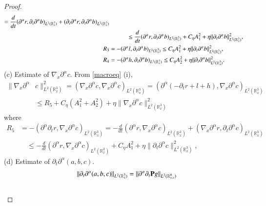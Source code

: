 \documentclass{amsart}[12pt, article]
\begin{document}
\begin{proof}
\begin{align*}
=\frac{d}{dt}({{\partial}}^\alpha   r,{{\partial}}_i{{\partial}}^\alpha  b)_{L^2({{{\mathbb R}}}^3_x)}+
({{\partial}}_i{{\partial}}^\alpha   r,{{\partial}}_t{{\partial}}^\alpha  b)_{L^2({{{\mathbb R}}}^3_x)}
\\&\hspace*{1cm}\le
\frac{d}{dt}({{\partial}}^\alpha   r,{{\partial}}_i{{\partial}}^\alpha  b)_{L^2({{{\mathbb R}}}^3_x)}+
C_\eta A_1^2
+\eta
\|{{\partial}}_t{{\partial}}^\alpha  b\|^2_{L^2({{{\mathbb R}}}^3_x)},
\\
R_3&=-({{\partial}}^\alpha   l,{{\partial}}_i{{\partial}}^\alpha  b)_{L^2({{{\mathbb R}}}^3_x)}\le
C_\eta A_1^2
+
\eta
\|{{\partial}}_i{{\partial}}^\alpha  b\|^2_{L^2({{{\mathbb R}}}^3_x)},
\\R_4&=-({{\partial}}^\alpha   h,{{\partial}}_i{{\partial}}^\alpha  b)_{L^2({{{\mathbb R}}}^3_x)}\le
C_\eta A_2^{{2}}
+
\eta
\|{{\partial}}_i{{\partial}}^\alpha  b\|^2_{L^2({{{\mathbb R}}}^3_x)}.
\end{align*}
(c) Estimate of $\nabla_x{{\partial}}^\alpha  c$. {}From \eqref{macroeq} (i),
 \begin{align*}
 \|\nabla_x {{\partial}}^\alpha &c\|_{L^2({{{\mathbb R}}}^3_x)}^2
=(\nabla_x {{\partial}}^\alpha c,\nabla_x {{\partial}}^\alpha c)_{L^2({{{\mathbb R}}}^3_x)}
= ({{\partial}}^\alpha (-{{\partial}}_tr+l+h),\nabla_x {{\partial}}^\alpha c)_{L^2({{{\mathbb R}}}^3_x)}
\\&
\le R_5 
+C_\eta(A_1^2+A_2^2)+\eta \|\nabla_x {{\partial}}^\alpha c\|_{L^2({{{\mathbb R}}}^3_x)}^2
\end{align*}
where
\begin{align*}
R_5&=-({{\partial}}^\alpha {{\partial}}_tr,\nabla_x {{\partial}}^\alpha c)_{L^2({{{\mathbb R}}}^3_x)}=
-\frac{d}{dt}({{\partial}}^\alpha r,\nabla_x {{\partial}}^\alpha c)_{L^2({{{\mathbb R}}}^3_x)}+
(\nabla_x{{\partial}}^\alpha r, {{\partial}}_t {{\partial}}^\alpha c)_{L^2({{{\mathbb R}}}^3_x)}
\\&\quad
\le
-\frac{d}{dt}({{\partial}}^\alpha r,\nabla_x {{\partial}}^\alpha c)_{L^2({{{\mathbb R}}}^3_x)}+
C_\eta A_1^2 
+\eta
\|{{\partial}}_t{{\partial}}^\alpha  c\|^2_{L^2({{{\mathbb R}}}^3_x)},
\end{align*}
(d) Estimate of ${{\partial}}_t{{\partial}}^\alpha  (a,b,c)$. \
\begin{align}\label{ptabc}
\|{{\partial}}_t{{\partial}}^\alpha & (a,b,c)\|_{L^2({{{\mathbb R}}}^3_x)}=\|{{\partial}}^\alpha {{\partial}}_t {{\bf P}} g\|_{L^2({{{\mathbb R}}}^6_{x, v})}
\\& \notag

\end{align}
\end{proof}
\end{document}

